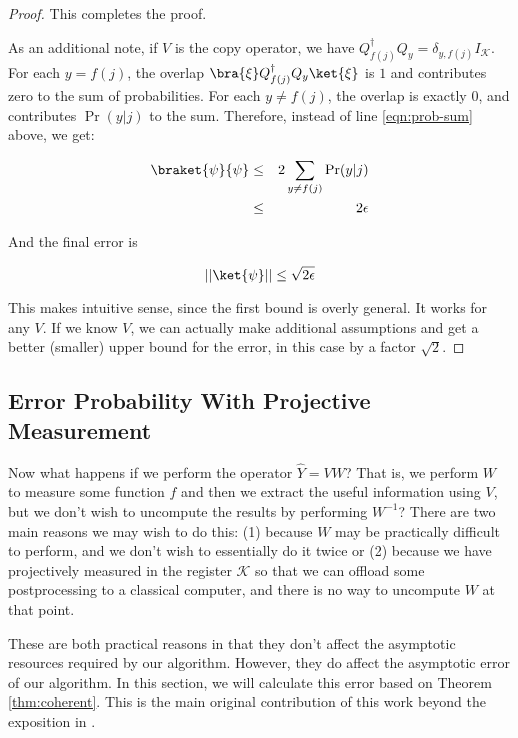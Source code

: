 \begin{proof}
This completes the proof.

As an additional note, if $V$ is the copy operator, we have
$Q_{f(j)}^{\dagger}Q_y = \delta_{y,f(j)}I_{\mathcal{K}}$.
For each $y = f(j)$, the overlap $\bra{\xi}Q_{f(j)}^{\dagger}Q_y \ket{\xi}$
is $1$ and contributes zero to the sum of probabilities.
For each $y \ne f(j)$, the overlap is exactly $0$, and contributes
$\Pr(y|j)$ to the sum.
Therefore, instead of line \ref{eqn:prob-sum} above, we get:

\begin{eqnarray}
\braket{\psi}{\psi} & \le & 2\sum_{y \ne f(j)} \Pr(y|j)\\
                    & \le & 2\epsilon
\end{eqnarray}

And the final error is

\begin{equation}
\lvert\lvert \ket{\psi} \rvert\rvert \le \sqrt{2\epsilon}
\end{equation}

This makes intuitive sense, since the first bound is overly general.
It works for any $V$. If we know $V$, we can actually make additional
assumptions and get a better (smaller) upper bound for the error, in this
case by a factor $\sqrt{2}$.
\end{proof}

\subsection{Error Probability With Projective Measurement}
\label{subsec:error-proj}

Now what happens if we perform the operator $\hat{Y} = VW$? That is, we
perform $W$ to measure some function $f$ and then we extract the useful
information using $V$, but we don't wish to uncompute the results by
performing $W^{-1}$? There are two main reasons we may wish to do this:
(1) because $W$ may be practically difficult to perform, and we don't wish
to essentially do it twice or (2) because we have projectively measured
in the register $\mathcal{K}$ so that we can offload some postprocessing to
a classical computer, and there is no way to uncompute $W$ at that point.

These are both practical reasons in that they don't affect the
asymptotic resources required by our algorithm. However, they do affect
the asymptotic error of our algorithm. In this section, we will calculate
this error based on Theorem \ref{thm:coherent}. This is the main original
contribution of this work beyond the exposition in \cite{ksv02}.

